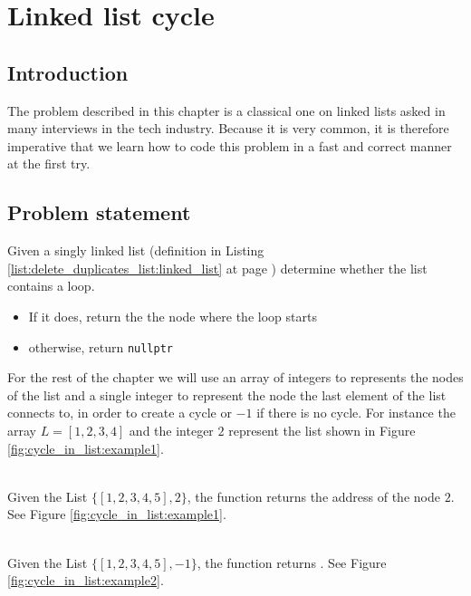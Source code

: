 %

\chapter{Linked list cycle}
\label{ch:cycle_in_list}
\section*{Introduction}
The problem described in this chapter is a classical one on linked lists asked in many interviews in
the tech industry. Because it is very common, it is therefore imperative that we learn how to code
this problem in a fast and correct manner at the first try.

\section{Problem statement}
\begin{exercise}
Given a singly linked list (definition in Listing \ref{list:delete_duplicates_list:linked_list} at
page \pageref{list:delete_duplicates_list:linked_list}) determine whether the list contains a loop.
\begin{itemize}
		\item If it does, return the the node where the loop starts
		\item otherwise, return \lstinline[columns=fixed]{nullptr}
\end{itemize}

For the rest of the chapter we will use an array of integers to represents the nodes of the list and
a single integer to represent the node the last element of the list connects to, in order to create
a cycle or $-1$ if there is no cycle. For instance  the array $L=[1,2,3,4]$ and the integer $2$
represent the list shown in Figure \ref{fig:cycle_in_list:example1}.

\begin{example}
	\hfill \\
	Given the List $\{[1,2,3,4,5],2\}$, the function returns the address of the node $2$. See Figure
	\ref{fig:cycle_in_list:example1}.
\end{example}

\begin{example}
	\hfill \\
	Given the List $\{[1,2,3,4,5],-1\}$, the function returns . See Figure
	\ref{fig:cycle_in_list:example2}.
\end{example}
\end{exercise}

